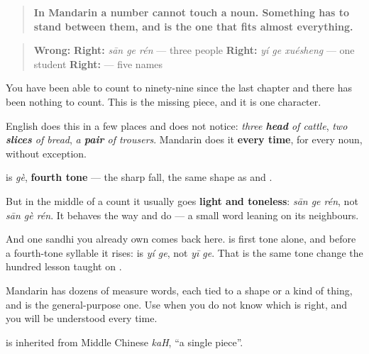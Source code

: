 \begin{grammarlens}[title={Grammar Lens: number + \zh{个} + noun}]
\begin{quote}
\textbf{In Mandarin a number cannot touch a noun. Something has to stand between them, and  is the one that fits almost everything.}
\end{quote}

\begin{quote}
\textbf{Wrong:}  \textbf{Right:} \textbf{} \emph{sān ge rén} — three people \textbf{Right:} \textbf{} \emph{yí ge xuésheng} — one student \textbf{Right:} \textbf{} — five names
\end{quote}

You have been able to count to ninety-nine since the last chapter and there has been nothing to count. This is the missing piece, and it is one character.

English does this in a few places and does not notice: \emph{three \textbf{head} of cattle}, \emph{two \textbf{slices} of bread}, \emph{a \textbf{pair} of trousers}. Mandarin does it \textbf{every time}, for every noun, without exception.
\end{grammarlens}

\begin{sounds}
\textbf{} is \emph{gè}, \textbf{fourth tone} — the sharp fall, the same shape as  and .

But in the middle of a count it usually goes \textbf{light and toneless}: \emph{sān ge rén}, not \emph{sān gè rén}. It behaves the way  and  do — a small word leaning on its neighbours.

And one sandhi you already own comes back here.  is first tone alone, and before a fourth-tone syllable it rises: \textbf{} is \emph{yí ge}, not \emph{yī ge}. That is the same tone change the hundred lesson taught on .

Mandarin has dozens of measure words, each tied to a shape or a kind of thing, and  is the general-purpose one. Use  when you do not know which is right, and you will be understood every time.
\end{sounds}

\begin{cousinweb}
\textbf{} is inherited from Middle Chinese \emph{kaH}, \textquotedblleft{}a single piece\textquotedblright{}.
\end{cousinweb}

